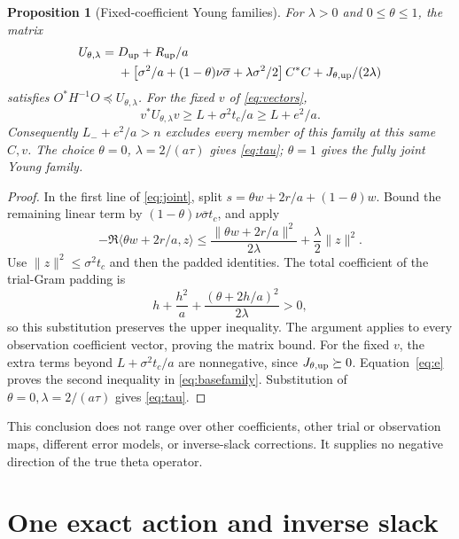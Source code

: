 \documentclass[11pt,a4paper]{article}
\newcommand{\ip}[2]{\langle #1,#2\rangle}
\newcommand{\norm}[1]{\lVert #1\rVert}
\newcommand{\sigmab}{\overline{\sigma}}
\newtheorem{proposition}[theorem]{Proposition}
\theoremstyle{definition}
\theoremstyle{remark}
\numberwithin{equation}{section}
\begin{document}
\begin{proposition}[Fixed-coefficient Young families]\label{prop:families}
For $\lambda>0$ and $0\le\theta\le1$, the matrix
\begin{equation}\label{eq:Ufamily}
\begin{split}
 U_{\theta,\lambda}
 ={}&D_{\rm up}+R_{\rm up}/a\\
 &+\left[\sigma^2/a+(1-\theta)\nu\sigmab+
                      \lambda\sigma^2/2\right]C^*C
       +J_{\theta,{\rm up}}/(2\lambda)
\end{split}
\end{equation}
satisfies $O^*H^{-1}O\preceq U_{\theta,\lambda}$.
For the fixed $v$ of \eqref{eq:vectors},
\begin{equation}\label{eq:basefamily}
 v^*U_{\theta,\lambda}v
 \ge L+\sigma^2t_c/a
 \ge L+e^2/a.
\end{equation}
Consequently $L_-+e^2/a>n$ excludes every member of this family at
this same $C,v$. The choice $\theta=0$, $\lambda=2/(a\tau)$ gives
\eqref{eq:tau}; $\theta=1$ gives the fully joint Young family.
\end{proposition}
\begin{proof}
In the first line of \eqref{eq:joint}, split
$s=\theta w+2r/a+(1-\theta)w$. Bound the remaining linear term by
$(1-\theta)\nu\sigmab t_c$, and apply
\[
 -\Re\ip{\theta w+2r/a}z
 \le\frac{\norm{\theta w+2r/a}^2}{2\lambda}
       +\frac{\lambda}{2}\norm z^2.
\]
Use $\norm z^2\le\sigma^2t_c$ and then the padded identities.
The total coefficient of the trial-Gram padding is
\[
 h+\frac{h^2}{a}+\frac{(\theta+2h/a)^2}{2\lambda}>0,
\]
so this substitution preserves the upper inequality.
The argument applies to every observation coefficient vector, proving
the matrix bound. For the fixed $v$, the extra terms beyond
$L+\sigma^2t_c/a$ are nonnegative, since
$J_{\theta,{\rm up}}\succeq0$. Equation~\eqref{eq:e} proves the second
inequality in \eqref{eq:basefamily}. Substitution of
$\theta=0,\lambda=2/(a\tau)$ gives \eqref{eq:tau}.
\end{proof}

This conclusion does not range over other coefficients, other trial or
observation maps, different error models, or inverse-slack corrections.
It supplies no negative direction of the true theta operator.

\section{One exact action and inverse slack}\label{sec:rankone}
\end{document}
